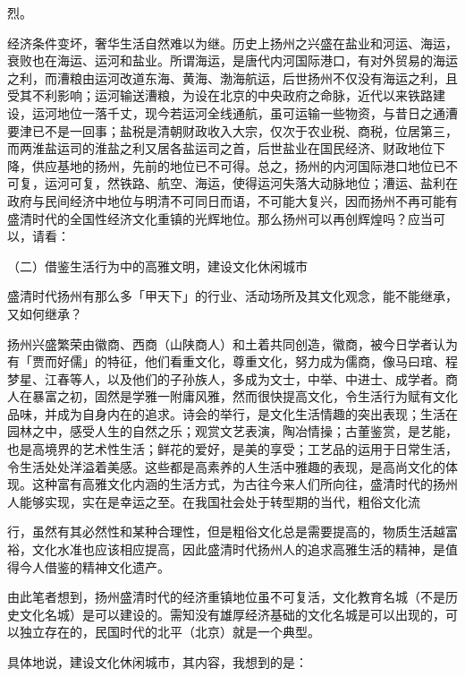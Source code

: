 \noindent 烈。

经济条件变坏，奢华生活自然难以为继。历史上扬州之兴盛在盐业和河运、海运，衰败也在海运、运河和盐业。所谓海运，是唐代内河国际港口，有对外贸易的海运之利，而漕粮由运河改道东海、黄海、渤海航运，后世扬州不仅没有海运之利，且受其不利影响；运河输送漕粮，为设在北京的中央政府之命脉，近代以来铁路建设，运河地位一落千丈，现今若运河全线通航，虽可运输一些物资，与昔日之通漕要津已不是一回事；盐税是清朝财政收入大宗，仅次于农业税、商税，位居第三，而两淮盐运司的淮盐之利又居各盐运司之首，后世盐业在国民经济、财政地位下降，供应基地的扬州，先前的地位已不可得。总之，扬州的内河国际港口地位已不可复，运河可复，然铁路、航空、海运，使得运河失落大动脉地位；漕运、盐利在政府与民间经济中地位与明清不可同日而语，不可能大复兴，因而扬州不再可能有盛清时代的全国性经济文化重镇的光辉地位。那么扬州可以再创辉煌吗？应当可以，请看：

\begin{BookQuote}
（二）借鉴生活行为中的高雅文明，建设文化休闲城市
\end{BookQuote}

盛清时代扬州有那么多「甲天下」的行业、活动场所及其文化观念，能不能继承，又如何继承？

扬州兴盛繁荣由徽商、西商（山陕商人）和土着共同创造，徽商，被今日学者认为有「贾而好儒」的特征，他们看重文化，尊重文化，努力成为儒商，像马曰琯、程梦星、江春等人，以及他们的子孙族人，多成为文士，中举、中进士、成学者。商人在暴富之初，固然是学雅一附庸风雅，然而很快提高文化，令生活行为赋有文化品味，并成为自身内在的追求。诗会的举行，是文化生活情趣的突出表现；生活在园林之中，感受人生的自然之乐；观赏文艺表演，陶冶情操；古董鉴赏，是艺能，也是高境界的艺术性生活；鲜花的爱好，是美的享受；工艺品的运用于日常生活，令生活处处洋溢着美感。这些都是高素养的人生活中雅趣的表现，是高尚文化的体现。这种富有高雅文化内涵的生活方式，为古往今来人们所向往，盛清时代的扬州人能够实现，实在是幸运之至。在我国社会处于转型期的当代，粗俗文化流


\noindent 行，虽然有其必然性和某种合理性，但是粗俗文化总是需要提高的，物质生活越富裕，文化水准也应该相应提高，因此盛清时代扬州人的追求高雅生活的精神，是值得今人借鉴的精神文化遗产。

由此笔者想到，扬州盛清时代的经济重镇地位虽不可复活，文化教育名城（不是历史文化名城）是可以建设的。需知没有雄厚经济基础的文化名城是可以出现的，可以独立存在的，民国时代的北平（北京）就是一个典型。

具体地说，建设文化休闲城市，其内容，我想到的是：

